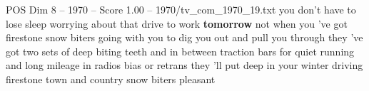\begin{textsample}{POS Dim 8 – 1970 – Score 1.00 – 1970/tv\_com\_1970\_19.txt}  \label{ex:f8_pos_087}
you don't have to lose sleep worrying about that drive to work \textbf{tomorrow} not when you 've got firestone snow biters going with you to dig you out and pull you through they 've got two sets of deep biting teeth and in between traction bars for quiet running and long mileage in radios bias or retrans they 'll put deep in your winter driving firestone town and country snow biters pleasant

\end{textsample}
